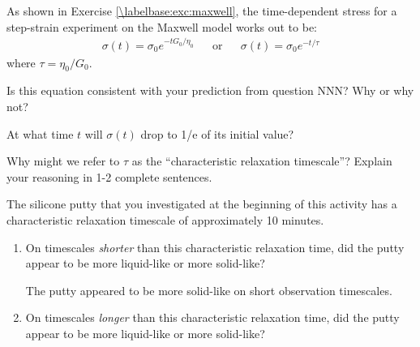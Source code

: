 \begin{activity}
\begin{infobox}
	As shown in Exercise \ref{\labelbase:exc:maxwell}, the time-dependent stress for a step-strain experiment on the Maxwell model works out to be:
	\begin{align*}
		\sigma(t) = \sigma_0 e^{-t G_0/\eta_0}  && \text{or} && \sigma(t) = \sigma_0 e^{-t /\tau}
	\end{align*}
	where $\tau = \eta_0/G_0$.
\end{infobox}

\begin{ctqs}
	
	\question Is this equation consistent with your prediction from question  NNN?  Why or why not?
	
					\begin{solution}[1.5in]
					\end{solution}
		
	\question At what time $t$ will $\sigma(t)$ drop to 1/e of its initial value?
	
					\begin{solution}[1.5in]
					\end{solution}
		
		\question Why might we refer to $\tau$ as the ``characteristic relaxation timescale''?  Explain your reasoning in 1-2 complete sentences.
	
					\begin{solution}[1.5in]
					\end{solution}
					
		\question The silicone putty that you investigated at the beginning of this activity has a characteristic relaxation timescale of approximately 10 minutes.
		
			\begin{enumerate}
				\item On timescales \emph{shorter} than this characteristic relaxation time, did the putty appear to be more liquid-like or more solid-like?
	
					\begin{solution}[0.75in]
					
						The putty appeared to be more solid-like on short observation timescales.
						
					\end{solution}
				
				\item On timescales \emph{longer} than this characteristic relaxation time, did the putty appear to be more liquid-like or more solid-like?
	

\end{enumerate}
\end{ctqs}
\end{activity}
